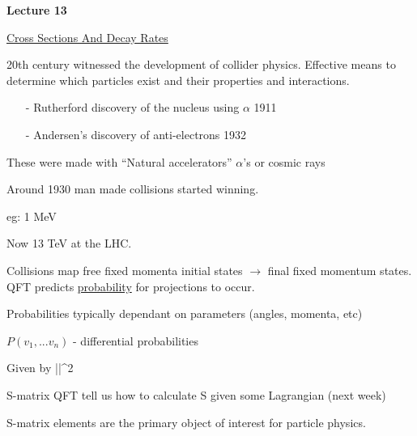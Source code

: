 



\thispagestyle{fancy}

\begin{center}
{\huge \textbf{Lecture 13}}
\end{center}

{\fontsize{14}{16}\selectfont


\underline{\Large Cross Sections And Decay Rates}

20th century witnessed the development of collider physics. 
Effective means to determine which particles exist and their properties and interactions.

\begin{itemize}
\item[-] Rutherford discovery of the nucleus using $\alpha$ 1911 
\item[-] Andersen's discovery of anti-electrons 1932
\end{itemize}

These were made with ``Natural accelerators'' $\alpha$'s or cosmic rays

Around 1930 man made collisions started winning. 

eg: 1 MeV 

Now 13 TeV at the LHC.

Collisions map free fixed momenta initial states $\rightarrow$ final fixed momentum states. \\

QFT predicts \underline{probability} for projections to occur. 

Probabilities typically dependant on parameters (angles, momenta, etc) 

\begin{center}
$P(v_1, ... v_n)$ - differential probabilities
\end{center}

Given by 
\be
||^2
\ee


\be
{} \hspace{1in} \textrm{S-matrix}
\ee
QFT tell us how to calculate S given some Lagrangian (next week)

S-matrix elements are the primary object of interest for particle physics. 

}

